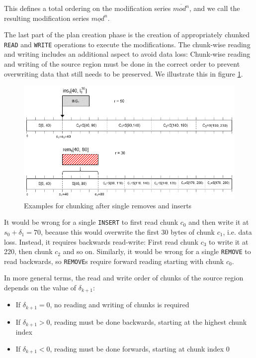 \documentclass[english, 10pt, openright, twocolumn, landscape, twoside, notitlepage, a4paper, pdftex]		
{article}
\begin{document}
This defines a total ordering on the modification series $\overline{mod^{n}}$, and we call the resulting modification series $\underline{mod^{n}}$.

The last part of the plan creation phase is the creation of appropriately chunked \texttt{READ} and \texttt{WRITE} operations to execute the modifications. The chunk-wise reading and writing includes an additional aspect to avoid data loss: Chunk-wise reading and writing of the source region must be done in the correct order to prevent overwriting data that still needs to be preserved. We illustrate this in figure \ref{fig:ChunkOrder}.

\begin{figure}[htbp]
\centering
\includegraphics[width=1.00\columnwidth]{figures/Chunks.png}
\caption{Examples for chunking after single removes and inserts}
\label{fig:ChunkOrder}
\end{figure}

It would be wrong for a single \texttt{INSERT} to first read chunk $c_{0}$ and then write it at $s_{0}+\delta_{1}=70$, because this would overwrite the first 30 bytes of chunk $c_{1}$, i.e. data loss. Instead, it requires backwards read-write: First read chunk $c_{3}$ to write it at 220, then chunk $c_{2}$ and so on. Similarly, it would be wrong for a single \texttt{REMOVE} to read backwards, so \texttt{REMOVE}s require forward reading starting with chunk $c_{0}$.

In more general terms, the read and write order of chunks of the source region depends on the value of $\delta_{k+1}$:
\begin{itemize}
\item If $\delta_{k+1}=0$, no reading and writing of chunks is required
\item If $\delta_{k+1}>0$, reading must be done backwards, starting at the highest chunk index
\item If $\delta_{k+1}<0$, reading must be done forwards, starting at chunk index 0
\end{itemize}
\end{document}
